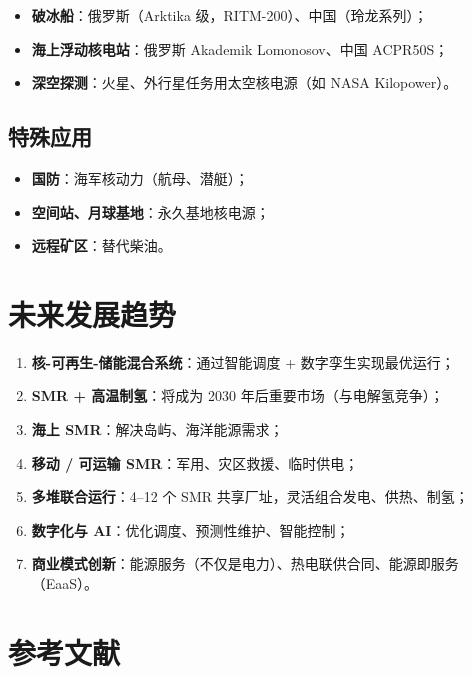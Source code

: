 \documentclass[
  UTF8,
  scheme=plain,
  fontsize=10pt,
  openany
]{ctexbook}
\begin{document}
\begin{itemize}
\tightlist
\item
  \textbf{破冰船}：俄罗斯（Arktika 级，RITM-200）、中国（玲龙系列）；
\item
  \textbf{海上浮动核电站}：俄罗斯 Akademik Lomonosov、中国 ACPR50S；
\item
  \textbf{深空探测}：火星、外行星任务用太空核电源（如 NASA Kilopower）。
\end{itemize}

\subsection{特殊应用}\label{ux7279ux6b8aux5e94ux7528}

\begin{itemize}
\tightlist
\item
  \textbf{国防}：海军核动力（航母、潜艇）；
\item
  \textbf{空间站、月球基地}：永久基地核电源；
\item
  \textbf{远程矿区}：替代柴油。
\end{itemize}

\section{未来发展趋势}\label{ux672aux6765ux53d1ux5c55ux8d8bux52bf-1}

\begin{enumerate}
\def\labelenumi{\arabic{enumi}.}
\tightlist
\item
  \textbf{核-可再生-储能混合系统}：通过智能调度 + 数字孪生实现最优运行；
\item
  \textbf{SMR + 高温制氢}：将成为 2030 年后重要市场（与电解氢竞争）；
\item
  \textbf{海上 SMR}：解决岛屿、海洋能源需求；
\item
  \textbf{移动 / 可运输 SMR}：军用、灾区救援、临时供电；
\item
  \textbf{多堆联合运行}：4--12 个 SMR
  共享厂址，灵活组合发电、供热、制氢；
\item
  \textbf{数字化与 AI}：优化调度、预测性维护、智能控制；
\item
  \textbf{商业模式创新}：能源服务（不仅是电力）、热电联供合同、能源即服务（EaaS）。
\end{enumerate}

\section{参考文献}\label{ux53c2ux8003ux6587ux732e-10}
\end{document}
